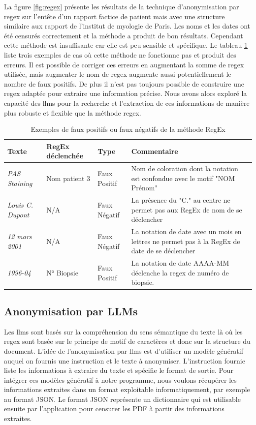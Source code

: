 La figure \ref{fig:regex} présente les résultats de la technique d'anonymisation par \gls{regex} sur l'entête d'un rapport factice de patient mais avec une structure similaire aux rapport de l'institut de myologie de Paris. Les noms et les dates ont été censurés correctement et la méthode a produit de bon résultats. Cependant cette méthode est insuffisante car elle est peu sensible et spécifique. Le tableau \ref{tab:regex_fail} liste trois exemples de cas où cette méthode ne fonctionne pas et produit des erreurs. Il est possible de corriger ces erreurs en augmentant la somme de \gls{regex} utilisée, mais augmenter le nom de \gls{regex} augmente aussi potentiellement le nombre de faux positifs. De plus il n'est pas toujours possible de construire une \gls{regex} adaptée pour extraire une information précise. Nous avons alors exploré la capacité des \gls{llms} pour la recherche et l'extraction de ces informations de manière plus robuste et flexible que la méthode \gls{regex}.
\begin{table}[ht]
\centering
\caption{Exemples de faux positifs ou faux négatifs de la méthode RegEx}
\label{tab:regex_fail}
\begin{tabularx}{\textwidth}{|X|X|X|X|}
\hline
\textbf{Texte} & \textbf{RegEx déclenchée} & \textbf{Type} & \textbf{Commentaire} \\ \hline
\textit{PAS Staining} & Nom patient 3 & Faux Positif & Nom de coloration dont la notation est confondue avec le motif "NOM Prénom" \\ \hline
\textit{Louis C. Dupont} & N/A & Faux Négatif & La présence du "C." au centre ne permet pas aux RegEx de nom de se déclencher \\ \hline
\textit{12 mars 2001} & N/A & Faux Négatif & La notation de date avec un mois en lettres ne permet pas à la RegEx de date de se déclencher \\ \hline
\textit{1996-04} & N° Biopsie & Faux Positif & La notation de date AAAA-MM déclenche la \gls{regex} de numéro de biopsie. \\ \hline
\end{tabularx}
\end{table}

\subsection{Anonymisation par LLMs}
Les \gls{llms} sont basés sur la compréhension du sens sémantique du texte là où les \gls{regex} sont basée sur le principe de motif de caractères et donc sur la structure du document. L'idée de l'anonymisation par \gls{llms} est d'utiliser un modèle génératif auquel on fournis une instruction et le texte à anonymiser. L'instruction fournie liste les informations à extraire du texte et spécifie le format de sortie. Pour intégrer ces modèles génératif à notre programme, nous voulons récupérer les informations extraites dans un format exploitable informatiquement, par exemple au format JSON. Le format JSON représente un dictionnaire qui est utilisable ensuite par l'application pour censurer les PDF à partir des informations extraites.

